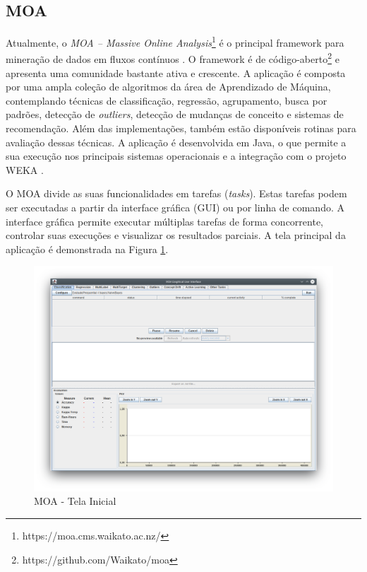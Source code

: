 \documentclass[msc, classic, a4paper]{ufbathesis}
\begin{document}
\subsection{MOA}

Atualmente, o \textit{MOA – Massive Online Analysis}\footnote{https://moa.cms.waikato.ac.nz/} é o principal framework para mineração de dados em fluxos contínuos \cite{Bifet:2010:MMO:1756006.1859903}.
O framework é de código-aberto\footnote{https://github.com/Waikato/moa} e apresenta uma comunidade bastante ativa e crescente.
A aplicação é composta por uma ampla coleção de algoritmos da área de Aprendizado de Máquina, contemplando técnicas de classificação, regressão, agrupamento, busca por padrões, detecção de \textit{outliers}, detecção de mudanças de conceito e sistemas de recomendação.
Além das implementações, também estão disponíveis rotinas para avaliação dessas técnicas.
A aplicação é desenvolvida em Java, o que permite a sua execução nos principais sistemas operacionais e a integração com o projeto WEKA \cite{Hall:2009:WDM:1656274.1656278}.

O MOA divide as suas funcionalidades em tarefas (\textit{tasks}).
Estas tarefas podem ser executadas a partir da interface gráfica (GUI) ou por linha de comando.
A interface gráfica permite executar múltiplas tarefas de forma concorrente,
controlar suas execuções e visualizar os resultados parciais.
A tela principal da aplicação é demonstrada na Figura \ref{fig:moa}.

\begin{figure}[H]
\begin{center}
    \includegraphics[scale=0.4]{imagens/moa.png}
    \caption{MOA - Tela Inicial}
    \label{fig:moa}
\end{center}
\end{figure}
\end{document}
